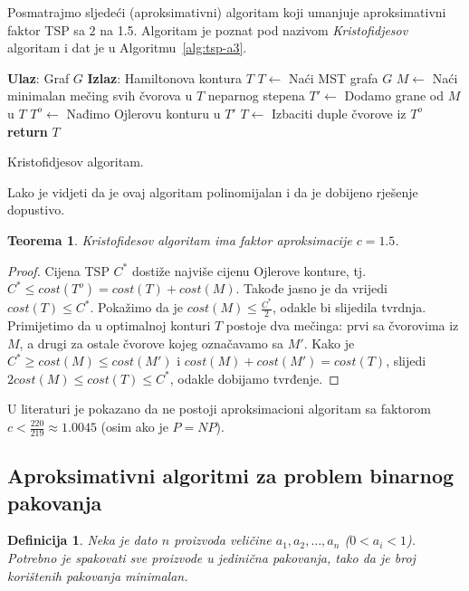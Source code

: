 \documentclass[a4paper, utf8, 11pt, colorlinks]{book}
\newtheorem{definition}{Definicija}[chapter]
\newtheorem{thm}{Teorema}[chapter]
\theoremstyle{definition}
\begin{document}
Posmatrajmo sljedeći (aproksimativni) algoritam koji umanjuje aproksimativni faktor TSP sa $2$ na 1.5. Algoritam je poznat pod nazivom \emph{Kristofidjesov} algoritam i dat je u Algoritmu~\ref{alg:tsp-a3}.

\begin{algorithm}[H] 

	\begin{algorithmic}[1]
		\STATE \textbf{Ulaz}: Graf $G$
		\STATE \textbf{Izlaz}: Hamiltonova kontura $T$ 
		\STATE $T \gets$ Naći MST grafa $G$
		\STATE $M \gets$ Naći minimalan mečing svih čvorova u $T$ neparnog stepena
		\STATE $T' \gets$ Dodamo grane od $M$ u $T$
		\STATE $T^o\gets$ Nađimo Ojlerovu konturu u $T'$
		\STATE $T \gets$ Izbaciti duple čvorove iz $T^o$
		\STATE \textbf{return} $T$
	\end{algorithmic}	
    \caption{Kristofidjesov algoritam.}
    \label{alg:tsp-a3}
\end{algorithm}
  Lako je vidjeti da je ovaj algoritam polinomijalan i da je dobijeno rješenje dopustivo.
  \begin{thm}
  	  Kristofidesov algoritam ima faktor aproksimacije $c=1.5$.
  \end{thm}
\begin{proof}
  Cijena TSP $C^*$ dostiže najviše cijenu Ojlerove konture, tj.  $C^*\leq cost(T^o) = cost(T) + cost(M)$.  Takođe jasno je da vrijedi $cost(T) \leq C^*$. Pokažimo da je $cost(M) \leq  \frac{C^*}{2}$, odakle bi slijedila tvrdnja. Primijetimo da u optimalnoj konturi $T$ postoje dva mečinga: prvi sa čvorovima iz $M$, a drugi za ostale čvorove kojeg označavamo sa $M'$. 
  Kako je $C^* \geq cost(M) \leq cost(M')$ i $cost(M) + cost(M') = cost(T)$, slijedi 
  $2 cost(M) \leq cost(T) \leq C^*$, odakle dobijamo tvrđenje.  
\end{proof} 

U literaturi je pokazano da ne postoji  aproksimacioni algoritam sa faktorom  $c < \frac{220}{219} \approx 1.0045$ (osim ako je $P=NP$). 
 
 
 \subsection{Aproksimativni algoritmi za problem binarnog pakovanja}
\begin{definition}
    Neka je dato $n$ proizvoda veličine $a_1,a_2,\ldots,a_n$ ($0<a_i<1$). Potrebno je spakovati sve proizvode u jedinična pakovanja, tako da je broj korištenih pakovanja minimalan.  
\end{definition} 
\end{document}

